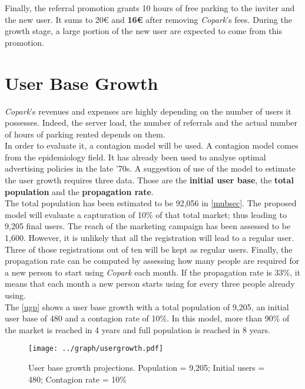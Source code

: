 \documentclass[12pt,a4paper,oneside]{book}
\newcommand{\bp}{\textit{Copark}}
\begin{document}
Finally, the referral promotion grants 10 hours of free parking to the inviter and the new user. It sums to 20\euro{} and \textbf{16\euro{}} after removing \bp{}'s fees. During the growth stage, a large portion of the new user are expected to come from this promotion.

\section{User Base Growth}
\bp{}'s revenues and expenses are highly depending on the number of users it possesses. Indeed, the server load, the number of referrals and the actual number of hours of parking rented depends on them.\\

In order to evaluate it, a contagion model will be used. A contagion model comes from the epidemiology field. It has already been used to analyse optimal advertising policies in the late ’70s. A suggestion of use of the model to estimate the user growth requires three data. Those are the \textbf{initial user base}, the \textbf{total population} and the \textbf{propagation rate}.\cite{cmep}\\

The total population has been estimated to be 92,056 in \autoref{mubsec}. The proposed model will evaluate a capturation of 10\% of that total market; thus leading to 9,205 final users. The reach of the marketing campaign has been assessed to be 1,600. However, it is unlikely that all the registration will lead to a regular user. Three of those registrations out of ten will be kept as regular users. Finally, the propagation rate can be computed by assessing how many people are required for a new person to start using \bp{} each month. If the propagation rate is 33\%, it means that each month a new person starts using for every three people already using.\\

The \autoref{ugp} shows a user base growth with a total population of 9,205, an initial user base of 480 and a contagion rate of 10\%. In this model, more than 90\% of the market is reached in 4 years and full population is reached in 8 years.\\

\begin{figure}[h]
\centering
\caption{User base growth projections. Population = 9,205; Initial users = 480; Contagion rate = 10\%}
\label{ugp}
\texttt{[image: ../graph/usergrowth.pdf]}
\end{figure}
\end{document}
